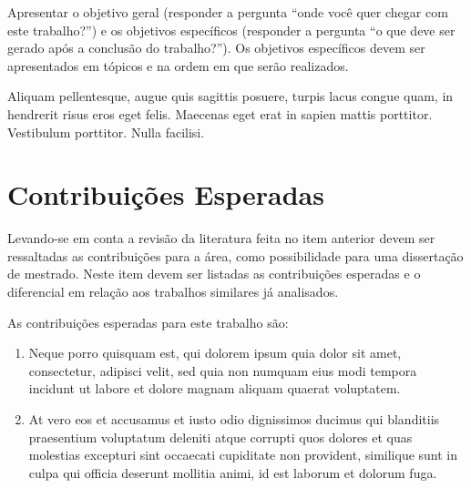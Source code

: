 \textcolor{RedOrange}{Apresentar o objetivo geral (responder a pergunta ``onde você quer chegar com este trabalho?'') e os objetivos específicos (responder a pergunta ``o que deve ser gerado após a conclusão do trabalho?''). Os objetivos específicos devem ser apresentados em tópicos e na ordem em que serão realizados.}

Aliquam pellentesque, augue quis sagittis posuere, turpis lacus congue quam, in hendrerit risus eros eget felis. Maecenas eget erat in sapien mattis porttitor. Vestibulum porttitor. Nulla facilisi.


\section{Contribuições Esperadas}
\textcolor{RedOrange}{Levando-se em conta a revisão da literatura feita no item anterior devem ser ressaltadas as contribuições para a área, como possibilidade para uma dissertação de mestrado. Neste item devem ser listadas as contribuições esperadas e o diferencial em relação aos trabalhos similares já analisados.}

As contribuições esperadas para este trabalho são:

\begin{enumerate}[label=(\roman*)]
\item Neque porro quisquam est, qui dolorem ipsum quia dolor sit amet, consectetur, adipisci velit, sed quia non numquam eius modi tempora incidunt ut labore et dolore magnam aliquam quaerat voluptatem.

\item At vero eos et accusamus et iusto odio dignissimos ducimus qui blanditiis praesentium voluptatum deleniti atque corrupti quos dolores et quas molestias excepturi sint occaecati cupiditate non provident, similique sunt in culpa qui officia deserunt mollitia animi, id est laborum et dolorum fuga.
\end{enumerate}

